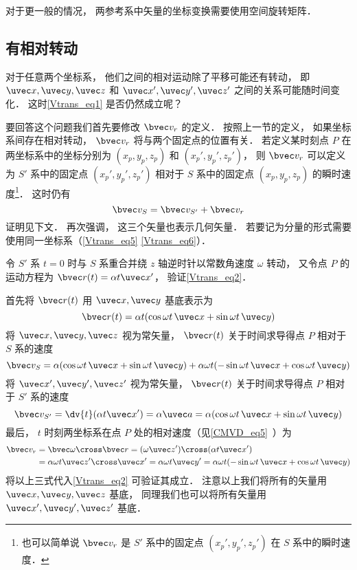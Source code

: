 对于更一般的情况， 两参考系中矢量的坐标变换需要使用空间旋转矩阵．

\subsection{有相对转动}
对于任意两个坐标系， 他们之间的相对运动除了平移可能还有转动， 即 $\uvec x, \uvec y, \uvec z$ 和 $\uvec x', \uvec y', \uvec z'$ 之间的关系可能随时间变化． 这时\autoref{Vtrans_eq1} 是否仍然成立呢？

要回答这个问题我们首先要修改 $\bvec v_r$ 的定义． 按照上一节的定义， 如果坐标系间存在相对转动， $\bvec v_r$ 将与两个固定点的位置有关． 若定义某时刻点 $P$ 在两坐标系中的坐标分别为 $(x_p, y_p, z_p)$ 和 $(x_p', y_p', z_p')$， 则 $\bvec v_r$ 可以定义为 $S'$ 系中的固定点 $(x_p', y_p', z_p')$ 相对于 $S$ 系中的固定点 $(x_p, y_p, z_p)$ 的瞬时速度\footnote{也可以简单说 $\bvec v_r$ 是 $S'$ 系中的固定点 $(x_p', y_p', z_p')$ 在 $S$ 系中的瞬时速度．}． 这时仍有
\begin{equation}\label{Vtrans_eq2}
\bvec v_{S} = \bvec v_{S'} + \bvec v_r
\end{equation}
证明见下文． 再次强调， 这三个矢量也表示几何矢量． 若要记为分量的形式需要使用同一坐标系（\autoref{Vtrans_eq5} \autoref{Vtrans_eq6}）．

\begin{example}{}\label{Vtrans_ex1}
令 $S'$ 系 $t = 0$ 时与 $S$ 系重合并绕 $z$ 轴逆时针以常数角速度 $\omega$ 转动， 又令点 $P$ 的运动方程为 $\bvec r(t) = \alpha t \uvec x'$， 验证\autoref{Vtrans_eq2}．

首先将 $\bvec r(t)$ 用 $\uvec x, \uvec y$ 基底表示为
\begin{equation}
\bvec r(t) = \alpha t (\cos\omega t\, \uvec x + \sin\omega t\, \uvec y)
\end{equation}
将 $\uvec x, \uvec y, \uvec z$ 视为常矢量， $\bvec r(t)$ 关于时间求导得点 $P$ 相对于 $S$ 系的速度
\begin{equation}
\bvec v_S = \alpha (\cos\omega t \,\uvec x + \sin\omega t \,\uvec y)
+ \alpha\omega t (-\sin\omega t \,\uvec x + \cos\omega t \,\uvec y)
\end{equation}
将 $\uvec x', \uvec y', \uvec z'$ 视为常矢量， $\bvec r(t)$ 关于时间求导得点 $P$ 相对于 $S'$ 系的速度
\begin{equation}
\bvec v_{S'} = \dv{t} (\alpha t \uvec x') = \alpha \uvec a = \alpha (\cos\omega t\, \uvec x + \sin\omega t \,\uvec y)
\end{equation}
最后， $t$ 时刻两坐标系在点 $P$ 处的相对速度（见\autoref{CMVD_eq5}~）为
\begin{equation}\label{Vtrans_eq3}
\begin{aligned}
\bvec v_r &= \bvec\omega \cross \bvec r = (\omega \uvec z') \cross (\alpha t \uvec x') \\
&= \alpha\omega t \uvec z'\cross\uvec x' = \alpha\omega t \uvec y' = \alpha\omega t(-\sin \omega t \,\uvec x + \cos\omega t \,\uvec y)
\end{aligned}
\end{equation}
将以上三式代入\autoref{Vtrans_eq2} 可验证其成立． 注意以上我们将所有的矢量用 $\uvec x, \uvec y, \uvec z$ 基底， 同理我们也可以将所有矢量用 $\uvec x', \uvec y', \uvec z'$ 基底．
\end{example}

